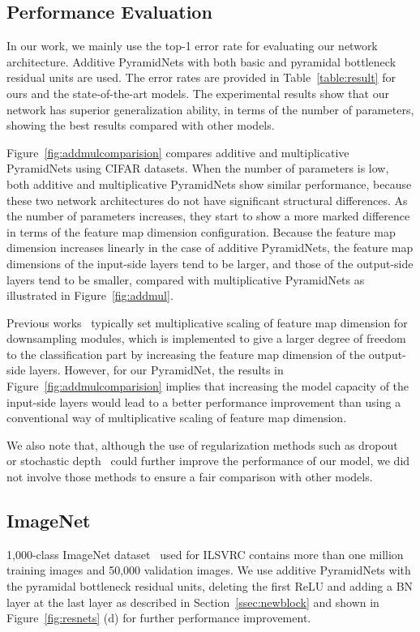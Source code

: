 \documentclass[10pt,twocolumn,letterpaper]{article}
\begin{document}
\subsection{Performance Evaluation}

In our work, we mainly use the top-1 error rate for evaluating our network architecture. Additive PyramidNets with both basic and pyramidal bottleneck residual units are used. The error rates are provided in Table~\ref{table:result} for ours and the state-of-the-art models. The experimental results show that our network has superior generalization ability, in terms of the number of parameters, showing the best results compared with other models. 

Figure~\ref{fig:addmulcomparision} compares additive and multiplicative PyramidNets using CIFAR datasets. When the number of parameters is low, both additive and multiplicative PyramidNets show similar performance, because these two network architectures do not have significant structural differences. As the number of parameters increases, they start to show a more marked difference in terms of the feature map dimension configuration. Because the feature map dimension increases linearly in the case of additive PyramidNets, the feature map dimensions of the input-side layers tend to be larger, and those of the output-side layers tend to be smaller, compared with multiplicative PyramidNets as illustrated in Figure~\ref{fig:addmul}.

Previous works~\cite{resnet, VGG} typically set multiplicative scaling of feature map dimension for downsampling modules, which is implemented to give a larger degree of freedom to the classification part by increasing the feature map dimension of the output-side layers. However, for our PyramidNet, the results in Figure~\ref{fig:addmulcomparision} implies that increasing the model capacity of the input-side layers would lead to a better performance improvement than using a conventional way of multiplicative scaling of feature map dimension.

We also note that, although the use of regularization methods such as dropout~\cite{dropout} or stochastic depth~\cite{stochasticdepth} could further improve the performance of our model, we did not involve those methods to ensure a fair comparison with other models.

\subsection{ImageNet}
1,000-class ImageNet dataset~\cite{ImageNet} used for ILSVRC contains more than one million training images and 50,000 validation images. We use additive PyramidNets with the pyramidal bottleneck residual units, deleting the first ReLU and adding a BN layer at the last layer as described in Section~\ref{ssec:newblock} and shown in Figure~\ref{fig:resnets} (d) for further performance improvement.
\end{document}
